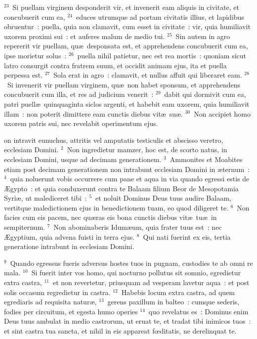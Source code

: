 ${}^{23}$~Si puellam virginem desponderit vir, et invenerit eam aliquis in civitate, et concubuerit cum ea,
${}^{24}$~educes utrumque ad portam civitatis illius, et lapidibus obruentur~: puella, quia non clamavit, cum esset in civitate~: vir, quia humiliavit uxorem proximi sui~: et auferes malum de medio tui.
${}^{25}$~Sin autem in agro repererit vir puellam, qu\ae\ desponsata est, et apprehendens concubuerit cum ea, ipse morietur solus~:
${}^{26}$~puella nihil patietur, nec est rea mortis~: quoniam sicut latro consurgit contra fratrem suum, et occidit animam ejus, ita et puella perpessa est.
${}^{27}$~Sola erat in agro~: clamavit, et nullus affuit qui liberaret eam.
${}^{28}$~Si invenerit vir puellam virginem, qu\ae\ non habet sponsum, et apprehendens concubuerit cum illa, et res ad judicium venerit~:
${}^{29}$~dabit qui dormivit cum ea, patri puell\ae\ quinquaginta siclos argenti, et habebit eam uxorem, quia humiliavit illam~: non poterit dimittere eam cunctis diebus vit\ae\ su\ae .
${}^{30}$~Non accipiet homo uxorem patris sui, nec revelabit operimentum ejus.

\bchapter
{}on intravit eunuchus, attritis vel amputatis testiculis et abscisso veretro, ecclesiam Domini.
${}^{2}$~Non ingredietur mamzer, hoc est, de scorto natus, in ecclesiam Domini, usque ad decimam generationem.
${}^{3}$~Ammonites et Moabites etiam post decimam generationem non intrabunt ecclesiam Domini in \ae ternum~:
${}^{4}$~quia noluerunt vobis occurrere cum pane et aqua in via quando egressi estis de \AE gypto~: et quia conduxerunt contra te Balaam filium Beor de Mesopotamia Syri\ae , ut malediceret tibi~:
${}^{5}$~et noluit Dominus Deus tuus audire Balaam, vertitque maledictionem ejus in benedictionem tuam, eo quod diligeret te.
${}^{6}$~Non facies cum eis pacem, nec qu\ae ras eis bona cunctis diebus vit\ae\ tu\ae\ in sempiternum.
${}^{7}$~Non abominaberis Idum\ae um, quia frater tuus est~: nec \AE gyptium, quia advena fuisti in terra ejus.
${}^{8}$~Qui nati fuerint ex eis, tertia generatione intrabunt in ecclesiam Domini.


${}^{9}$~Quando egressus fueris adversus hostes tuos in pugnam, custodies te ab omni re mala.
${}^{10}$~Si fuerit inter vos homo, qui nocturno pollutus sit somnio, egredietur extra castra,
${}^{11}$~et non revertetur, priusquam ad vesperam lavetur aqua~: et post solis occasum regredietur in castra.
${}^{12}$~Habebis locum extra castra, ad quem egrediaris ad requisita natur\ae ,
${}^{13}$~gerens paxillum in balteo~: cumque sederis, fodies per circuitum, et egesta humo operies
${}^{14}$~quo revelatus es~: Dominus enim Deus tuus ambulat in medio castrorum, ut eruat te, et tradat tibi inimicos tuos~: et sint castra tua sancta, et nihil in eis appareat fœditatis, ne derelinquat te.


